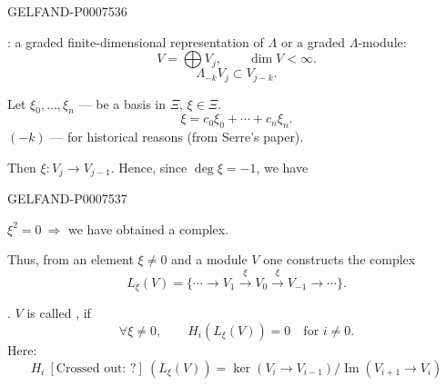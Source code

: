 \begin{GelfandAdjacentEvidence}{GELFAND-P000753}{6}


: a graded finite-dimensional representation of
\(\Lambda\) or a graded \(\Lambda\)-module:
\begin{equation*}
V=\bigoplus V_j,\qquad \dim V<\infty.
\tag{2}
\end{equation*}
\begin{equation*}
\Lambda_{-k}V_j\subset V_{j-k}.
\tag{3}
\end{equation*}

Let \(\xi_0,\ldots,\xi_n\) --- be a basis in \(\Xi\), \(\xi\in\Xi\).
\begin{equation*}
\xi=c_0\xi_0+\cdots+c_n\xi_n.
\tag{4}
\end{equation*}
\((-k)\) --- for historical reasons (from Serre's paper).

Then \(\xi:V_j\longrightarrow V_{j-1}\).
Hence, since \(\deg\xi=-1\), we have
\end{GelfandAdjacentEvidence}
\begin{GelfandAdjacentEvidence}{GELFAND-P000753}{7}


\(\xi^2=0\ \Rightarrow\) we have obtained a complex.

Thus, from an element \(\xi\ne0\) and a module \(V\) one constructs the complex
\begin{equation*}
L_\xi(V)=
\{\cdots\longrightarrow V_1\xrightarrow{\xi}V_0
\xrightarrow{\xi}V_{-1}\longrightarrow\cdots\}.
\tag{5}
\end{equation*}

. \(V\) is called , if
\begin{equation*}
\forall\xi\ne0,\qquad H_i(L_\xi(V))=0\quad\text{for }i\ne0.
\tag{6}
\end{equation*}
Here:
\begin{equation*}
H_i\ [\text{Crossed out: ?}]\ (L_\xi(V))
=\ker(V_i\longrightarrow V_{i-1})/
\operatorname{Im}(V_{i+1}\longrightarrow V_i)
\tag{7}
\end{equation*}
\end{GelfandAdjacentEvidence}
